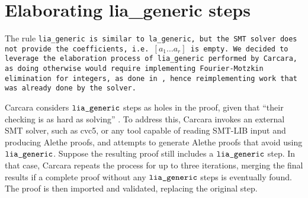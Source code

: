 \section{Elaborating lia\_generic steps}
\label{sec:elaboration-lia}

The rule \tt{lia\_generic} is similar to \tt{la\_generic}, but the SMT solver does not provide the coefficients,
i.e.\ \colorbox{orange!30}{$[a_1 \dots a_r]$} is empty.
We decided to leverage the elaboration process of \tt{lia\_generic} performed by Carcara, as doing otherwise would require implementing Fourier-Motzkin elimination for integers, as done in \cite{micromega,omegatest}, hence reimplementing work that was already done by the solver.

Carcara considers $\tt{lia\_generic}$ steps as holes in the proof, given that ``their checking is as hard as solving'' \cite[\S 3.2]{carcara}.
To address this, Carcara invokes an external SMT solver, such as cvc5, or any tool capable of reading SMT-LIB input and producing Alethe proofs, and attempts to generate Alethe proofs that avoid using $\tt{lia\_generic}$. 
Suppose the resulting proof still includes a $\tt{lia\_generic}$ step. In that case, Carcara repeats the process for up to three iterations, merging the final results if a complete proof without any $\tt{lia\_generic}$ steps is eventually found.
The proof is then imported and validated, replacing the original step.

